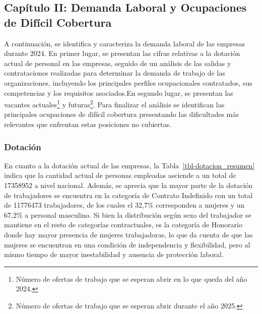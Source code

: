 \documentclass[
  11pt,
]{article}
\begin{document}
\FloatBarrier

\newpage

\subsection{Capítulo II: Demanda Laboral y Ocupaciones de Difícil
Cobertura}\label{capuxedtulo-ii-demanda-laboral-y-ocupaciones-de-difuxedcil-cobertura}

A continuación, se identifica y caracteriza la demanda laboral de las
empresas durante 2024. En primer lugar, se presentan las cifras
relativas a la dotación actual de personal en las empresas, seguido de
un análisis de las salidas y contrataciones realizadas para determinar
la demanda de trabajo de las organizaciones, incluyendo los principales
perfiles ocupacionales contratados, sus competencias y los requisitos
asociados.En segundo lugar, se presentan las vacantes
actuales\footnote{Número de ofertas de trabajo que se esperan abrir en
  lo que queda del año 2024.} y futuras\footnote{Número de ofertas de
  trabajo que se esperan abrir durante el año 2025.}. Para finalizar el
análisis se identifican las principales ocupaciones de difícil cobertura
presentando las dificultades más relevantes que enfrentan estas
posiciones no cubiertas.

\subsubsection{Dotación}\label{dotaciuxf3n}

En cuanto a la dotación actual de las empresas, la
Tabla~\ref{tbl-dotacion_resumen} indica que la cantidad actual de
personas empleadas asciende a un total de 17358952 a nivel nacional.
Además, se aprecia que la mayor parte de la dotación de trabajadores se
encuentra en la categoría de Contrato Indefinido con un total de
11776473 trabajadores, de los cuales el 32,7\% corresponden a mujeres y
un 67,2\% a personal masculino. Si bien la distribución según sexo del
trabajador se mantiene en el resto de categorías contractuales, es la
categoría de Honorario donde hay mayor presencia de mujeres
trabajadoras, lo que da cuenta de que las mujeres se encuentran en una
condición de independencia y flexibilidad, pero al mismo tiempo de mayor
inestabilidad y ausencia de protección laboral.

\FloatBarrier
\end{document}
